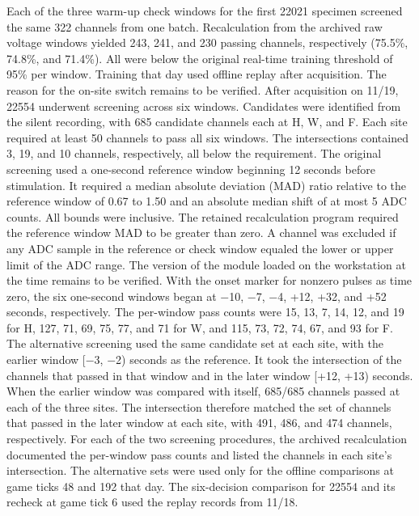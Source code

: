 \documentclass{article}
\begin{document}
Each of the three warm-up check windows for the first 22021 specimen screened the same 322 channels from one batch. Recalculation from the archived raw voltage windows yielded 243, 241, and 230 passing channels, respectively (75.5\%, 74.8\%, and 71.4\%). All were below the original real-time training threshold of 95\% per window. Training that day used offline replay after acquisition. The reason for the on-site switch remains to be verified. After acquisition on 11/19, 22554 underwent screening across six windows. Candidates were identified from the silent recording, with 685 candidate channels each at H, W, and F. Each site required at least 50 channels to pass all six windows. The intersections contained 3, 19, and 10 channels, respectively, all below the requirement. The original screening used a one-second reference window beginning 12 seconds before stimulation. It required a median absolute deviation (MAD) ratio relative to the reference window of 0.67 to 1.50 and an absolute median shift of at most 5 ADC counts. All bounds were inclusive. The retained recalculation program required the reference window MAD to be greater than zero. A channel was excluded if any ADC sample in the reference or check window equaled the lower or upper limit of the ADC range. The version of the module loaded on the workstation at the time remains to be verified. With the onset marker for nonzero pulses as time zero, the six one-second windows began at \ensuremath{-}10, \ensuremath{-}7, \ensuremath{-}4, +12, +32, and +52 seconds, respectively. The per-window pass counts were 15, 13, 7, 14, 12, and 19 for H, 127, 71, 69, 75, 77, and 71 for W, and 115, 73, 72, 74, 67, and 93 for F. The alternative screening used the same candidate set at each site, with the earlier window [\ensuremath{-}3, \ensuremath{-}2) seconds as the reference. It took the intersection of the channels that passed in that window and in the later window [+12, +13) seconds. When the earlier window was compared with itself, 685/685 channels passed at each of the three sites. The intersection therefore matched the set of channels that passed in the later window at each site, with 491, 486, and 474 channels, respectively. For each of the two screening procedures, the archived recalculation documented the per-window pass counts and listed the channels in each site's intersection. The alternative sets were used only for the offline comparisons at game ticks 48 and 192 that day. The six-decision comparison for 22554 and its recheck at game tick 6 used the replay records from 11/18.
\end{document}
